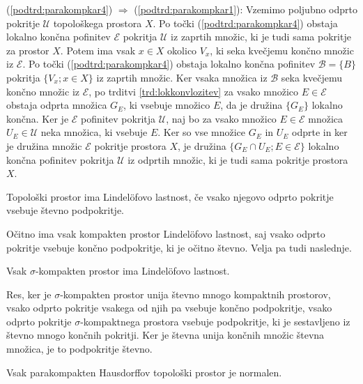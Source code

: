 \documentclass[mat1]{fmfdelo}
\newcommand{\Ucurl}{\mathcal{U}}
\begin{document}
\begin{dokaz}
(\ref{podtrd:parakompkar4}) $\Rightarrow$ (\ref{podtrd:parakompkar1}):
Vzemimo poljubno odprto pokritje $\Ucurl$ topološkega prostora $X$. Po točki (\ref{podtrd:parakompkar4}) obstaja lokalno končna pofinitev $\mathcal{E}$ pokritja $\Ucurl$ iz zaprtih množic, ki je tudi sama pokritje za prostor $X$. Potem ima vsak $x \in X$ okolico $V_x$, ki seka kvečjemu končno množic iz $\mathcal{E}$. Po točki (\ref{podtrd:parakompkar4}) obstaja lokalno končna pofinitev $\mathcal{B} = \lbrace B \rbrace$ pokritja $\lbrace V_x ; x \in X \rbrace$ iz zaprtih množic. Ker vsaka množica iz $\mathcal{B}$ seka kvečjemu končno množic iz $\mathcal{E}$, po trditvi \ref{trd:lokkonvlozitev} za vsako množico $E \in \mathcal{E}$ obstaja odprta množica $G_E$, ki vsebuje množico $E$, da je družina $\lbrace G_E \rbrace$ lokalno končna. Ker je $\mathcal{E}$ pofinitev pokritja $\Ucurl$, naj bo za vsako množico $E \in \mathcal{E}$ množica $U_E \in \Ucurl$ neka množica, ki vsebuje $E$. Ker so vse množice $G_E$ in $U_E$ odprte in ker je družina množic $\mathcal{E}$ pokritje prostora $X$, je družina $\lbrace G_E \cap U_E ; E \in \mathcal{E} \rbrace$ lokalno končna pofinitev pokritja $\Ucurl$ iz odprtih množic, ki je tudi sama pokritje prostora $X$.
\end{dokaz}

\begin{definicija}
Topološki prostor ima Lindel\"ofovo lastnost, če vsako njegovo odprto pokritje vsebuje števno podpokritje.
\end{definicija}

Očitno ima vsak kompakten prostor Lindel\"ofovo lastnost, saj vsako odprto pokritje vsebuje končno podpokritje, ki je očitno števno. Velja pa tudi naslednje.
\begin{trditev}\label{trd:lindel}
Vsak $\sigma$-kompakten prostor ima Lindel\"ofovo lastnost.
\end{trditev}
\begin{dokaz}
Res, ker je $\sigma$-kompakten prostor unija števno mnogo kompaktnih prostorov, vsako odprto pokritje vsakega od njih pa vsebuje končno podpokritje, vsako odprto pokritje $\sigma$-kompaktnega prostora vsebuje pod\-pok\-rit\-je, ki je sestavljeno iz števno mnogo končnih pokritji. Ker je števna unija končnih množic števna množica, je to podpokritje števno.
\end{dokaz}

\begin{trditev}\label{trd:parkompnorm} %
Vsak parakompakten Hausdorffov topološki prostor je normalen.
\end{trditev}
\end{document}
